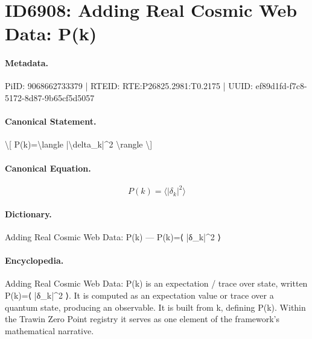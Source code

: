 \section*{ID6908: Adding Real Cosmic Web Data: P(k)}
\paragraph{Metadata.}
PiID: 9068662733379 | RTEID: RTE:P26825.2981:T0.2175 | UUID: ef89d1fd-f7c8-5172-8d87-9b65cf5d5057

\paragraph{Canonical Statement.}
\textbackslash{}[ P(k)=\textbackslash{}langle |\textbackslash{}delta\_k|\textasciicircum{}2 \textbackslash{}rangle \textbackslash{}]

\paragraph{Canonical Equation.}
\[
P(k)=\langle |\delta_k|^2 \rangle
\]

\paragraph{Dictionary.}
Adding Real Cosmic Web Data: P(k) — P(k)=⟨ |δ\_k|\textasciicircum{}2 ⟩

\paragraph{Encyclopedia.}
Adding Real Cosmic Web Data: P(k) is an expectation / trace over state, written P(k)=⟨ |δ\_k|\textasciicircum{}2 ⟩. It is computed as an expectation value or trace over a quantum state, producing an observable. It is built from k, defining P(k). Within the Trawin Zero Point registry it serves as one element of the framework's mathematical narrative.
